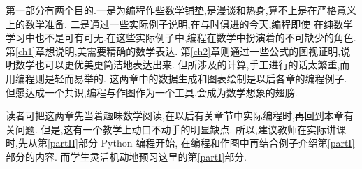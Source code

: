 \documentclass[main.tex]{subfiles}
\begin{document}
第一部分有两个目的.一是为编程作些数学铺垫,是漫谈和热身,算不上是在严格意义上的数学准备.
二是通过一些实际例子说明,在与时俱进的今天,编程即使
在纯数学学习中也不是可有可无.在这些实际例子中,编程在数学中扮演着的不可缺少的角色.
第\ref{ch1}章想说明,美需要精确的数学表达.
第\ref{ch2}章则通过一些公式的图视证明,说明数学也可以更优美更简洁地表达出来.
但所涉及的计算,手工进行的话太繁重,而用编程则是轻而易举的.
这两章中的数据生成和图表绘制是以后各章的编程例子.
但愿达成一个共识,编程与作图作为一个工具,会成为数学想象的翅膀.

读者可把这两章先当着趣味数学阅读,在以后有关章节中实际编程时,再回到本章有关问题.
但是,这有一个教学上动口不动手的明显缺点.
所以,建议教师在实际讲课时,先从第\ref{partII}部分 Python 编程开始,
在编程和作图中再结合例子介绍第\ref{partI}部分的内容.
而学生灵活机动地预习这里的第\ref{partI}部分.
\end{document}
